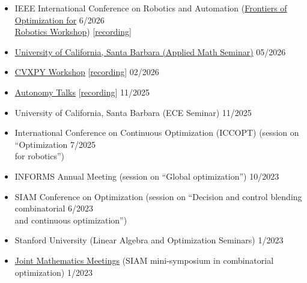 \documentclass[11pt,a4paper,sans,twoside]{moderncv}
\begin{document}
\begin{itemize}

\item IEEE International Conference on Robotics and Automation (\href{https://sites.google.com/robotics.utias.utoronto.ca/icra26-frontiers-optimization/}{\color{cyan}Frontiers of Optimization for} \hfill 6/2026 \\
\href{https://sites.google.com/robotics.utias.utoronto.ca/icra26-frontiers-optimization/}{\color{cyan}Robotics Workshop}) [\href{https://www.youtube.com/watch?v=R9DX7Qxf01c&t=806s}{\color{orange}recording}]

\item
\href{https://sites.google.com/site/ucsbpdeappliedmathseminar/spring-2026}{\color{cyan}University of California, Santa Barbara (Applied Math Seminar)} 
 \hfill 05/2026
	
\item
\href{https://www.cvxpy.org/workshop/2026/}{\color{cyan}CVXPY Workshop} [\href{https://www.youtube.com/watch?v=vnfMD4t3lkU}{\color{orange}recording}]  \hfill 02/2026

\item
\href{https://zardini.mit.edu/autonomytalks/}{\color{cyan}Autonomy Talks} [\href{https://www.youtube.com/watch?v=N-qSSUX83Rk}{\color{orange}recording}]  \hfill 11/2025

\item
University of California, Santa Barbara (ECE Seminar) \hfill 11/2025

\item
International Conference on Continuous Optimization (ICCOPT)  (session on ``Optimization \hfill 7/2025 \\ for robotics'') 

\item
INFORMS Annual Meeting (session on ``Global optimization'') \hfill 10/2023

\item
SIAM Conference on Optimization (session on ``Decision and control blending combinatorial \hfill 6/2023 \\ and continuous optimization'')
\item
Stanford University (Linear Algebra and Optimization Seminars) \hfill 1/2023

\item \href{https://www.jointmathematicsmeetings.org/meetings/national/jmm2023/2270_program.html}{\color{cyan}Joint Mathematics Meetings} (SIAM mini-symposium in combinatorial optimization)  \hfill 1/2023


\end{itemize}
\end{document}

